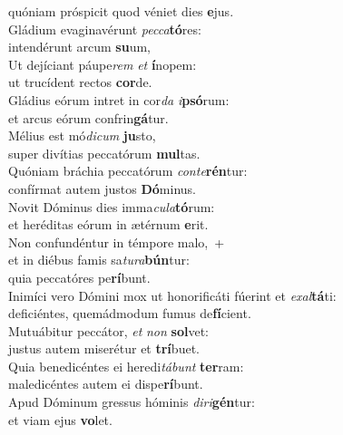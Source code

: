 \oddverse quóniam próspicit quod véniet dies \textbf{e}jus.\\
\evenverse Gládium evaginavérunt \textit{pec}\textit{ca}\textbf{tó}res:~\*\\
\evenverse intendérunt arcum \textbf{su}um,\\
\oddverse Ut dejíciant páupe\textit{rem} \textit{et} \textbf{í}nopem:~\*\\
\oddverse ut trucídent rectos \textbf{cor}de.\\
\evenverse Gládius eórum intret in cor\textit{da} \textit{i}\textbf{psó}rum:~\*\\
\evenverse et arcus eórum confrin\textbf{gá}tur.\\
\oddverse Mélius est mó\textit{di}\textit{cum} \textbf{ju}sto,~\*\\
\oddverse super divítias peccatórum \textbf{mul}tas.\\
\evenverse Quóniam bráchia peccatórum \textit{con}\textit{te}\textbf{rén}tur:~\*\\
\evenverse confírmat autem justos \textbf{Dó}minus.\\
\oddverse Novit Dóminus dies imma\textit{cu}\textit{la}\textbf{tó}rum:~\*\\
\oddverse et heréditas eórum in ætérnum \textbf{e}rit.\\
\evenverse Non confundéntur in témpore malo,~+\\
\evenverse  et in diébus famis sa\textit{tu}\textit{ra}\textbf{bún}tur:~\*\\
\evenverse quia peccatóres pe\textbf{rí}bunt.\\
\oddverse Inimíci vero Dómini mox ut honorificáti fúerint et \textit{e}\textit{xal}\textbf{tá}ti:~\*\\
\oddverse deficiéntes, quemádmodum fumus de\textbf{fí}cient.\\
\evenverse Mutuábitur peccátor, \textit{et} \textit{non} \textbf{sol}vet:~\*\\
\evenverse justus autem miserétur et \textbf{trí}buet.\\
\oddverse Quia benedicéntes ei heredi\textit{tá}\textit{bunt} \textbf{ter}ram:~\*\\
\oddverse maledicéntes autem ei dispe\textbf{rí}bunt.\\
\evenverse Apud Dóminum gressus hóminis \textit{di}\textit{ri}\textbf{gén}tur:~\*\\
\evenverse et viam ejus \textbf{vo}let.\\
